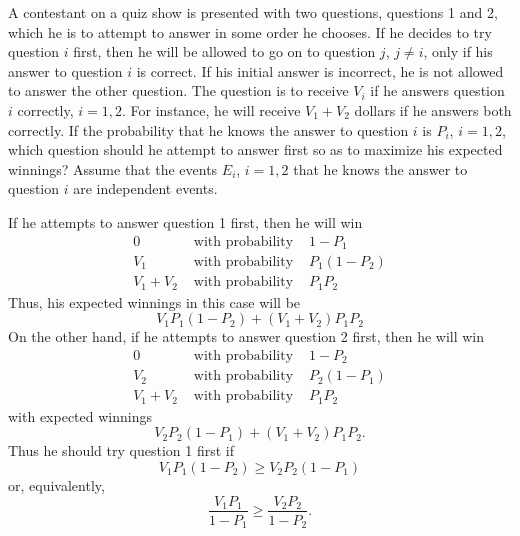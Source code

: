 \begin{changebar}
    \begin{example}
        A contestant on a quiz show is presented with two questions, questions 1 and 2, which he is to attempt to answer in some order he chooses. If he decides to try question $i$ first, then he will be allowed to go on to question $j$, $j \neq i$, only if his answer to question $i$ is correct. If his initial answer is incorrect, he is not allowed to answer the other question. The question is to receive $V_i$ if he answers question $i$ correctly, $i = 1, 2$. For instance, he will receive $V_1 + V_2$ dollars if he answers both correctly. If the probability that he knows the answer to question $i$ is $P_i$, $i = 1, 2$, which question should he attempt to answer first so as to maximize his expected winnings? Assume that the events $E_i$, $i = 1, 2$ that he knows the answer to question $i$ are independent events.
    \end{example}
    \begin{solution}
        If he attempts to answer question 1 first, then he will win \[
            \begin{aligned}
                0 & \text{ with probability } & 1 - P_1 \\
                V_1 & \text{ with probability } & P_1(1-P_2) \\
                V_1 + V_2 & \text{ with probability } & P_1P_2
            \end{aligned}
        \] Thus, his expected winnings in this case will be \[
            V_1P_1(1-P_2) + (V_1 + V_2)P_1P_2    
        \] On the other hand, if he attempts to answer question 2 first, then he will win \[
            \begin{aligned}
                0 & \text{ with probability } & 1 - P_2 \\
                V_2 & \text{ with probability } & P_2(1 - P_1) \\
                V_1 + V_2 & \text{ with probability } & P_1P_2
            \end{aligned}    
        \] with expected winnings \[
            V_2P_2(1 - P_1) + (V_1 + V_2)P_1P_2.    
        \] Thus he should try question 1 first if \[
            V_1P_1(1 - P_2) \geq V_2P_2(1 - P_1)    
        \] or, equivalently, \[
            \frac{V_1P_1}{1 - P_1} \geq \frac{V_2P_2}{1 - P_2}.    
        \]
    \end{solution}
\end{changebar}

